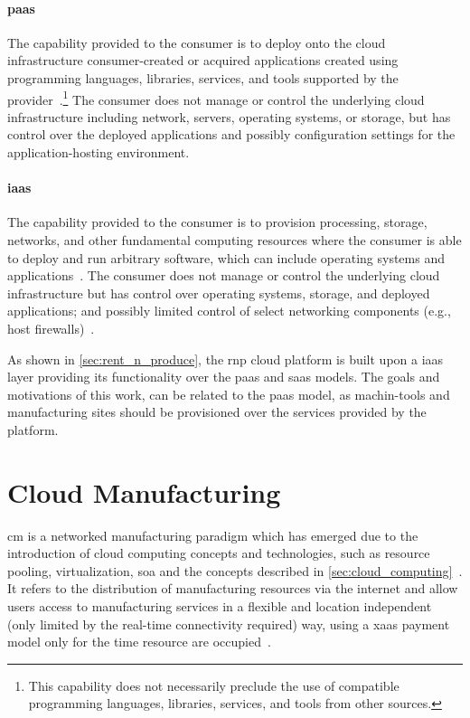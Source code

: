\documentclass[
a4paper,
twoside,
headsepline,
cleardoublepage=empty,
parskip=half,
draft=false
]{scrbook}
\begin{document}
			\paragraph{\gls{paas}} The capability provided to the consumer is to deploy onto the cloud infrastructure consumer-created or acquired applications created using programming languages, libraries, services, and tools supported by the provider~\cite{fehling2014cloud}.\footnote{This capability does not necessarily preclude the use of compatible programming languages, libraries, services, and tools from other sources.}
			The consumer does not manage or control the underlying cloud infrastructure including network, servers, operating systems, or storage, but has control over the deployed applications and possibly configuration settings for the application-hosting environment.
			
			\paragraph{\gls{iaas}} The capability provided to the consumer is to provision processing, storage, networks, and other fundamental computing resources where the consumer is able to deploy and run arbitrary software, which can include operating systems and applications~\cite{leymann2011cloud}. The consumer does not manage or control the underlying cloud infrastructure but has control over operating systems, storage, and deployed applications; and possibly limited control of select networking components (e.g., host firewalls)~\cite{mell2011nist}.
			
			As shown in \cref{sec:rent_n_produce}, the \gls{rnp} cloud platform is built upon a \gls{iaas} layer providing its functionality over the \gls{paas} and \gls{saas} models. The goals and motivations of this work, can be related to the \gls{paas} model, as machin-tools and manufacturing sites should be provisioned over the services provided by the platform.
			
	\newpage
			
		\section{Cloud Manufacturing}\label{sec:cloud_manufacturing}
		
			\gls{cm} is a networked manufacturing paradigm which has emerged due to the introduction of cloud computing concepts and technologies, such as resource pooling, virtualization, \gls{soa} and the concepts described in \cref{sec:cloud_computing}~\cite{macia2012cloud}. 
			It refers to the distribution of manufacturing resources via the internet and allow users access to manufacturing services in a flexible and location independent (only limited by the real-time connectivity required) way, using a \gls{xaas} payment model only for the time resource are occupied~\cite{macia2012cloud}.
			
\end{document}

